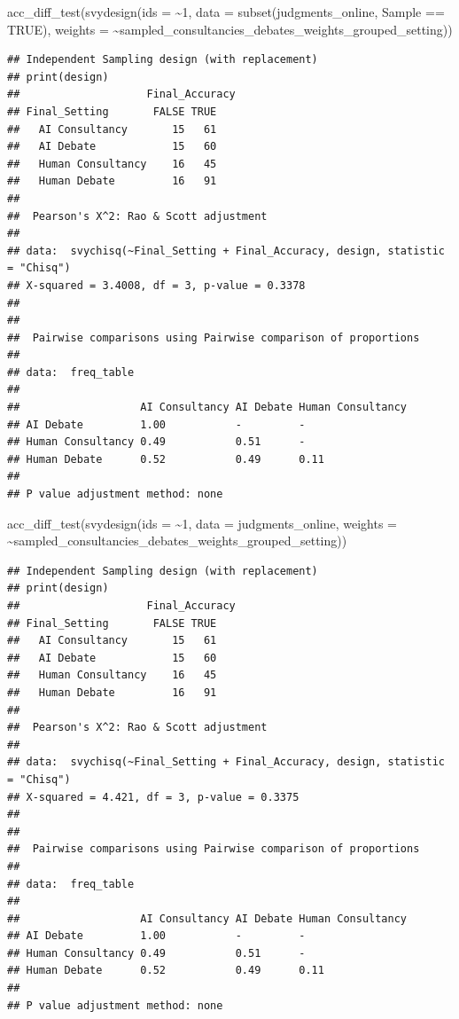 \documentclass[
]{article}
\newenvironment{Shaded}{\begin{snugshade}}{\end{snugshade}}
\newcommand{\AttributeTok}[1]{\textcolor[rgb]{0.77,0.63,0.00}{#1}}
\newcommand{\ConstantTok}[1]{\textcolor[rgb]{0.00,0.00,0.00}{#1}}
\newcommand{\DecValTok}[1]{\textcolor[rgb]{0.00,0.00,0.81}{#1}}
\newcommand{\FunctionTok}[1]{\textcolor[rgb]{0.00,0.00,0.00}{#1}}
\newcommand{\NormalTok}[1]{#1}
\newcommand{\SpecialCharTok}[1]{\textcolor[rgb]{0.00,0.00,0.00}{#1}}
\newcommand{\StringTok}[1]{\textcolor[rgb]{0.31,0.60,0.02}{#1}}
\begin{document}
\begin{Shaded}
\begin{Highlighting}[]
\FunctionTok{acc\_diff\_test}\NormalTok{(}\FunctionTok{svydesign}\NormalTok{(}\AttributeTok{ids =} \SpecialCharTok{\textasciitilde{}}\DecValTok{1}\NormalTok{, }\AttributeTok{data =} \FunctionTok{subset}\NormalTok{(judgments\_online, }\StringTok{\textasciigrave{}}\AttributeTok{Sample}\StringTok{\textasciigrave{}} \SpecialCharTok{==} \ConstantTok{TRUE}\NormalTok{), }\AttributeTok{weights =} \SpecialCharTok{\textasciitilde{}}\NormalTok{sampled\_consultancies\_debates\_weights\_grouped\_setting))}
\end{Highlighting}
\end{Shaded}

\begin{verbatim}
## Independent Sampling design (with replacement)
## print(design)
##                    Final_Accuracy
## Final_Setting       FALSE TRUE
##   AI Consultancy       15   61
##   AI Debate            15   60
##   Human Consultancy    16   45
##   Human Debate         16   91
## 
##  Pearson's X^2: Rao & Scott adjustment
## 
## data:  svychisq(~Final_Setting + Final_Accuracy, design, statistic = "Chisq")
## X-squared = 3.4008, df = 3, p-value = 0.3378
## 
## 
##  Pairwise comparisons using Pairwise comparison of proportions 
## 
## data:  freq_table 
## 
##                   AI Consultancy AI Debate Human Consultancy
## AI Debate         1.00           -         -                
## Human Consultancy 0.49           0.51      -                
## Human Debate      0.52           0.49      0.11             
## 
## P value adjustment method: none
\end{verbatim}

\begin{Shaded}
\begin{Highlighting}[]
\FunctionTok{acc\_diff\_test}\NormalTok{(}\FunctionTok{svydesign}\NormalTok{(}\AttributeTok{ids =} \SpecialCharTok{\textasciitilde{}}\DecValTok{1}\NormalTok{, }\AttributeTok{data =}\NormalTok{ judgments\_online, }\AttributeTok{weights =} \SpecialCharTok{\textasciitilde{}}\NormalTok{sampled\_consultancies\_debates\_weights\_grouped\_setting))}
\end{Highlighting}
\end{Shaded}

\begin{verbatim}
## Independent Sampling design (with replacement)
## print(design)
##                    Final_Accuracy
## Final_Setting       FALSE TRUE
##   AI Consultancy       15   61
##   AI Debate            15   60
##   Human Consultancy    16   45
##   Human Debate         16   91
## 
##  Pearson's X^2: Rao & Scott adjustment
## 
## data:  svychisq(~Final_Setting + Final_Accuracy, design, statistic = "Chisq")
## X-squared = 4.421, df = 3, p-value = 0.3375
## 
## 
##  Pairwise comparisons using Pairwise comparison of proportions 
## 
## data:  freq_table 
## 
##                   AI Consultancy AI Debate Human Consultancy
## AI Debate         1.00           -         -                
## Human Consultancy 0.49           0.51      -                
## Human Debate      0.52           0.49      0.11             
## 
## P value adjustment method: none
\end{verbatim}
\end{document}

